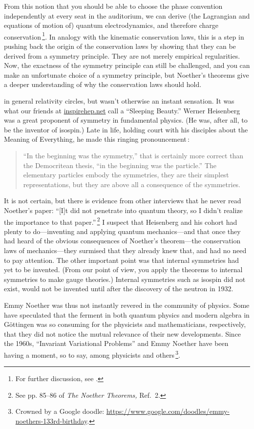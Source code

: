 \documentclass[twoside,symmetric]{tufte-handout}
\begin{document}
From this notion that you should be able to choose the phase convention independently at every seat in the auditorium, we can derive (the Lagrangian and equations of motion of) quantum electrodynamics, and therefore charge conservation$\,$\footnote[][-70pt]{For further discussion, see .}.  In analogy with the kinematic conservation laws, this is a step in pushing back the origin of the conservation laws by showing that they can be derived from a symmetry principle. They are not merely empirical regularities. Now, the exactness of the symmetry principle can still be challenged, and you can make an unfortunate choice of a symmetry principle, but Noether's theorems give a deeper understanding of why the conservation laws should hold.

 in general relativity circles, but wasn't otherwise an instant sensation. It was what our friends at \url{inspirehep.net} call a ``Sleeping Beauty.'' Werner Heisenberg was a great proponent of symmetry in fundamental physics. (He was, after all, to be the inventor of isospin.) Late in life, holding court with his disciples about the Meaning of Everything, he made this ringing pronouncement$\,$\cite{WernerH}:
\begin{quote}
``In the beginning was the symmetry,'' that is certainly more correct than the Democritean thesis, ``in the beginning was the particle.'' The elementary particles embody the symmetries, they are their simplest representations, but they are above all a consequence of the symmetries.
\end{quote}
It is not certain, but there is evidence from other interviews that he never read Noether's paper: ``[I]t did not penetrate into quantum theory, so I didn't realize the importance to that paper.''$\,$\footnote{See pp. 85--86 of \emph{The Noether Theorems,} Ref.~2.} I suspect that Heisenberg and his cohort had plenty to do---inventing and applying quantum mechanics---and that once they had heard of the obvious consequences of Noether's theorem---the conservation laws of mechanics---they surmised that they already knew that, and had no need to pay attention. The other important point was that internal symmetries had yet to be invented. (From our point of view, you apply the theorems to internal symmetries to make gauge theories.) Internal symmetries such as isospin did not exist, would not be invented until after the discovery of the neutron in 1932.

Emmy Noether was thus not instantly revered in the community of physics. Some have speculated that the ferment in both quantum physics and modern algebra in G\"ottingen was so consuming for the physicists and mathematicians, respectively, that they did not notice the mutual relevance of their new developments. Since the 1960s, ``Invariant Variational Problems'' and Emmy Noether have been having a moment, so to say, among physicists and others$\,$\footnote[][-24pt]{Crowned by a Google doodle: \url{https://www.google.com/doodles/emmy-noethers-133rd-birthday}.}.
\end{document}
